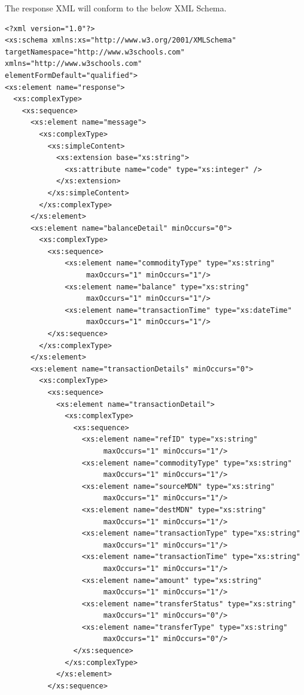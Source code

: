 \documentclass[11pt,titlepage]{article}
\begin{document}
The response XML will conform to the below XML Schema.
\begin{verbatim}
<?xml version="1.0"?>
<xs:schema xmlns:xs="http://www.w3.org/2001/XMLSchema" 
targetNamespace="http://www.w3schools.com" xmlns="http://www.w3schools.com" 
elementFormDefault="qualified">
<xs:element name="response">
  <xs:complexType>
    <xs:sequence>      
      <xs:element name="message">
        <xs:complexType>
          <xs:simpleContent>
            <xs:extension base="xs:string">
              <xs:attribute name="code" type="xs:integer" />
            </xs:extension>
          </xs:simpleContent>
        </xs:complexType>
      </xs:element>
      <xs:element name="balanceDetail" minOccurs="0">
        <xs:complexType>
          <xs:sequence>           
              <xs:element name="commodityType" type="xs:string" 
                   maxOccurs="1" minOccurs="1"/>
              <xs:element name="balance" type="xs:string"
                   maxOccurs="1" minOccurs="1"/>
              <xs:element name="transactionTime" type="xs:dateTime" 
                   maxOccurs="1" minOccurs="1"/>            
          </xs:sequence>
        </xs:complexType>
      </xs:element>
      <xs:element name="transactionDetails" minOccurs="0">
        <xs:complexType>
          <xs:sequence>
            <xs:element name="transactionDetail">
              <xs:complexType>
                <xs:sequence>
                  <xs:element name="refID" type="xs:string" 
                       maxOccurs="1" minOccurs="1"/>
                  <xs:element name="commodityType" type="xs:string" 
                       maxOccurs="1" minOccurs="1"/>
                  <xs:element name="sourceMDN" type="xs:string" 
                       maxOccurs="1" minOccurs="1"/>
                  <xs:element name="destMDN" type="xs:string" 
                       maxOccurs="1" minOccurs="1"/>
                  <xs:element name="transactionType" type="xs:string" 
                       maxOccurs="1" minOccurs="1"/>
                  <xs:element name="transactionTime" type="xs:string" 
                       maxOccurs="1" minOccurs="1"/>
                  <xs:element name="amount" type="xs:string" 
                       maxOccurs="1" minOccurs="1"/>
                  <xs:element name="transferStatus" type="xs:string" 
                       maxOccurs="1" minOccurs="0"/>
                  <xs:element name="transferType" type="xs:string" 
                       maxOccurs="1" minOccurs="0"/>
                </xs:sequence>
              </xs:complexType>
            </xs:element>
          </xs:sequence>

\end{verbatim}
\end{document}
